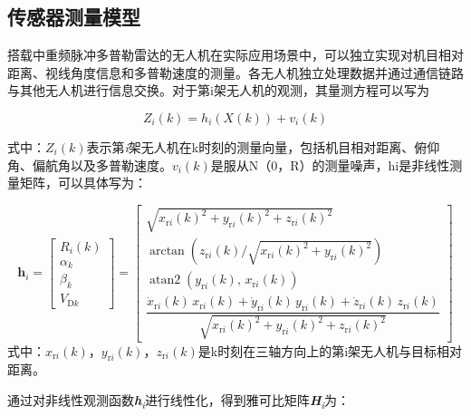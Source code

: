 \documentclass[UTF8,a4paper,zihao=-4]{ctexart}
\begin{document}
\subsection{传感器测量模型}\label{sec:sensor}

搭载中重频脉冲多普勒雷达的无人机在实际应用场景中，可以独立实现对机目相对距离、视线角度信息和多普勒速度的测量。各无人机独立处理数据并通过通信链路与其他无人机进行信息交换。对于第i架无人机的观测，其量测方程可以写为


\begin{equation}
Z_i(k)=h_i(X(k))+v_i(k)
\label{eq:word-10}
\end{equation}


式中：\(Z_i(k)\)表示第\emph{i}架无人机在k时刻的测量向量，包括机目相对距离、俯仰角、偏航角以及多普勒速度。\(v_i(k)\)是服从N（0，R）的测量噪声，hi是非线性测量矩阵，可以具体写为：


\begin{equation}
\mathbf{h}_i=\begin{bmatrix}R_{i}(k)\\\alpha_k\\\beta_k\\V_{\mathrm Dk}\end{bmatrix}
=\begin{bmatrix}
\sqrt{x_{\mathrm ri}(k)^2+y_{\mathrm ri}(k)^2+z_{\mathrm ri}(k)^2}\\[3pt]
\arctan\!\left(z_{\mathrm ri}(k)/\sqrt{x_{\mathrm ri}(k)^2+y_{\mathrm ri}(k)^2}\right)\\[3pt]
\operatorname{atan2}\!\left(y_{\mathrm ri}(k),\,x_{\mathrm ri}(k)\right)\\[3pt]
\dfrac{\dot{x}_{\mathrm ri}(k)\,x_{\mathrm ri}(k)+\dot{y}_{\mathrm ri}(k)\,y_{\mathrm ri}(k)+\dot{z}_{\mathrm ri}(k)\,z_{\mathrm ri}(k)}{\sqrt{x_{\mathrm ri}(k)^2+y_{\mathrm ri}(k)^2+z_{\mathrm ri}(k)^2}}
\end{bmatrix}
\label{eq:word-13}
\end{equation}
式中：\(x_{\mathrm ri}(k)\)，\(y_{\mathrm ri}(k)\)，\(z_{\mathrm ri}(k)\)是k时刻在三轴方向上的第i架无人机与目标相对距离。

通过对非线性观测函数\emph{\textbf{h}\textsubscript{i}}进行线性化，得到雅可比矩阵\emph{\textbf{H}\textsubscript{i}}为：
\end{document}
